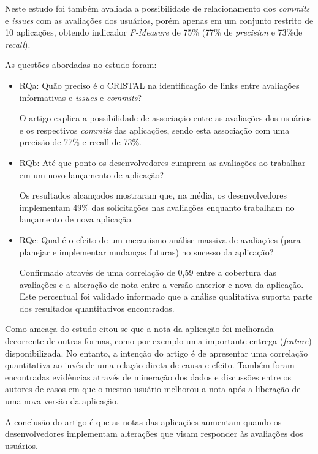 Neste estudo foi também avaliada a possibilidade de relacionamento dos \textit{commits} e \textit{issues} com as avaliações dos usuários, porém apenas em um conjunto restrito de 10 aplicações, obtendo indicador \textit{F-Measure} de 75\% (77\% de \textit{precision} e 73\%de \textit{recall}).

As questões abordadas no estudo foram:
\begin{itemize}
\item RQa: Quão preciso é o CRISTAL na identificação de links entre avaliações informativas e \textit{issues} e \textit{commits}?

O artigo explica a possibilidade de associação entre as avaliações dos usuários e os respectivos \textit{commits} das aplicações, sendo esta associação com uma precisão de 77\% e recall de 73\%.

\item RQb: Até que ponto os desenvolvedores cumprem as avaliações ao trabalhar em um novo lançamento de aplicação?

Os resultados alcançados mostraram que, na média, os desenvolvedores implementam 49\% das solicitações nas avaliações enquanto trabalham no lançamento de nova aplicação.

\item RQc: Qual é o efeito de um mecanismo análise massiva de avaliações (para planejar e implementar mudanças futuras) no sucesso da aplicação?

Confirmado através de uma correlação de 0,59 entre a cobertura das avaliações e a alteração de nota entre a versão anterior e nova da aplicação. Este percentual foi validado informado que a análise qualitativa suporta parte dos resultados quantitativos encontrados.
\end{itemize}

Como ameaça do estudo citou-se que a nota da aplicação foi melhorada decorrente de outras formas, como por exemplo uma importante entrega (\textit{feature}) disponibilizada. No entanto, a intenção do artigo é de apresentar uma correlação quantitativa ao invés de uma relação direta de causa e efeito. Também foram encontradas evidências através de mineração dos dados e discussões entre os autores de casos em que o mesmo usuário melhorou a nota após a liberação de uma nova versão da aplicação.

A conclusão do artigo é que as notas das aplicações aumentam quando os desenvolvedores implementam alterações que visam responder às avaliações dos usuários.

